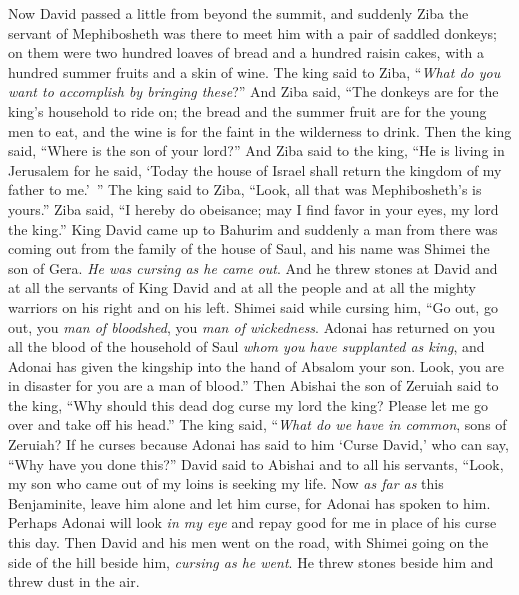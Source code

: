 \begin{biblechapter} %
 Now David passed a little from beyond the summit, and suddenly Ziba the servant of Mephibosheth was there to meet him with a pair of saddled donkeys; on them were two hundred loaves of bread and a hundred raisin cakes, with a hundred summer fruits and a skin of wine.
\verse The king said to Ziba, “\textit{What do you want to accomplish by bringing these}?” And Ziba said, “The donkeys are for the king’s household to ride on; the bread and the summer fruit are for the young men to eat, and the wine is for the faint in the wilderness to drink.
\verse Then the king said, “Where is the son of your lord?” And Ziba said to the king, “He is living in Jerusalem for he said, ‘Today the house of Israel shall return the kingdom of my father to me.’ ”
\verse The king said to Ziba, “Look, all that was Mephibosheth’s is yours.” Ziba said, “I hereby do obeisance; may I find favor in your eyes, my lord the king.”
 King David came up to Bahurim and suddenly a man from there was coming out from the family of the house of Saul, and his name was Shimei the son of Gera. \textit{He was cursing as he came out}.
\verse And he threw stones at David and at all the servants of King David and at all the people and at all the mighty warriors on his right and on his left.
\verse Shimei said while cursing him, “Go out, go out, you \textit{man of bloodshed}, you \textit{man of wickedness}.
\verse Adonai has returned on you all the blood of the household of Saul \textit{whom you have supplanted as king}, and Adonai has given the kingship into the hand of Absalom your son. Look, you are in disaster for you are a man of blood.”
\verse Then Abishai the son of Zeruiah said to the king, “Why should this dead dog curse my lord the king? Please let me go over and take off his head.”
\verse The king said, “\textit{What do we have in common}, sons of Zeruiah? If he curses because Adonai has said to him ‘Curse David,’ who can say, “Why have you done this?”
\verse David said to Abishai and to all his servants, “Look, my son who came out of my loins is seeking my life. Now \textit{as far as} this Benjaminite, leave him alone and let him curse, for Adonai has spoken to him.
\verse Perhaps Adonai will look \textit{in my eye} and repay good for me in place of his curse this day.
\verse Then David and his men went on the road, with Shimei going on the side of the hill beside him, \textit{cursing as he went}. He threw stones beside him and threw dust in the air.

\end{biblechapter}
